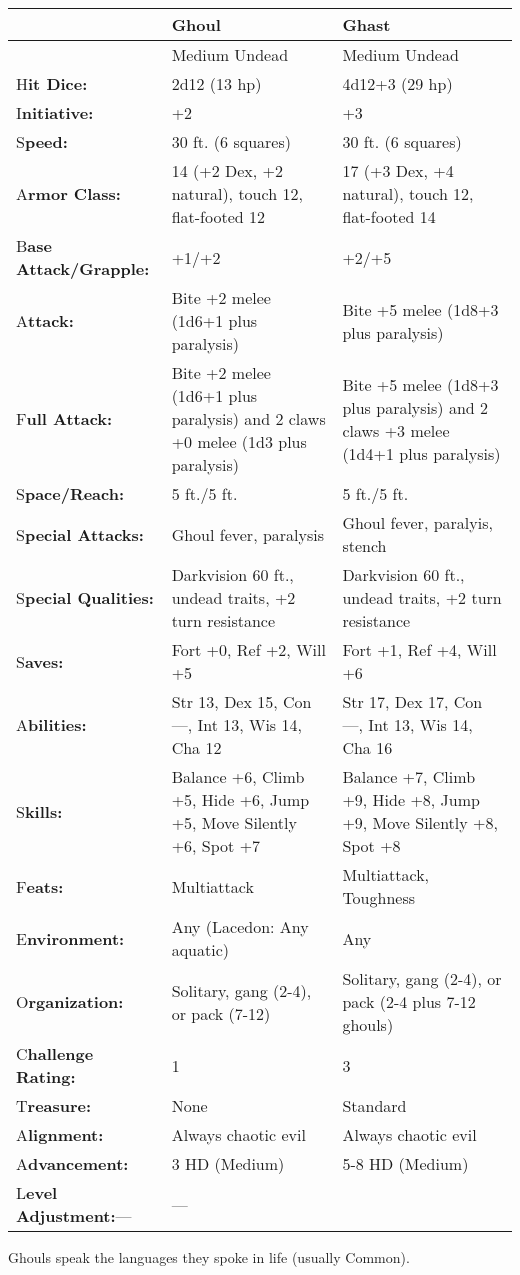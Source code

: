 \documentclass{article}
\begin{document}
\begin{tabular}{|>{\raggedright}p{55pt}|>{\raggedright}p{127pt}|>{\raggedright}p{131pt}|}
\hline
  & G\textbf{houl} & G\textbf{hast}\tabularnewline
\hline
  & Medium Undead & Medium Undead\tabularnewline
\hline
H\textbf{it Dice:} & 2d12 (13 hp) & 4d12+3 (29 hp)\tabularnewline
\hline
I\textbf{nitiative:} & +2 & +3\tabularnewline
\hline
S\textbf{peed:} & 30 ft. (6 squares) & 30 ft. (6 squares)\tabularnewline
\hline
A\textbf{rmor Class:} & 14 (+2 Dex, +2 natural), touch 12, flat-footed 12 & 17 
(+3 Dex, +4 natural), touch 12, flat-footed 14\tabularnewline
\hline
B\textbf{ase Attack/Grapple:} & +1/+2 & +2/+5\tabularnewline
\hline
A\textbf{ttack:} & Bite +2 melee (1d6+1 plus paralysis) & Bite +5 melee (1d8+3 
plus paralysis)\tabularnewline
\hline
F\textbf{ull Attack:} & Bite +2 melee (1d6+1 plus paralysis) and 2 claws +0 melee 
(1d3 plus paralysis) & Bite +5 melee (1d8+3 plus paralysis) and 2 claws +3 melee 
(1d4+1 plus paralysis)\tabularnewline
\hline
S\textbf{pace/Reach:} & 5 ft./5 ft. & 5 ft./5 ft.\tabularnewline
\hline
S\textbf{pecial Attacks:} & Ghoul fever, paralysis & Ghoul fever, paralyis, stench\tabularnewline
\hline
S\textbf{pecial Qualities:} & Darkvision 60 ft., undead traits, +2 turn resistance & Darkvision 
60 ft., undead traits, +2 turn resistance\tabularnewline
\hline
S\textbf{aves:} & Fort +0, Ref +2, Will +5 & Fort +1, Ref +4, Will +6\tabularnewline
\hline
A\textbf{bilities:} & Str 13, Dex 15, Con ---, Int 13, Wis 14, Cha 12 & Str 17, 
Dex 17, Con ---, Int 13, Wis 14, Cha 16\tabularnewline
\hline
S\textbf{kills:} & Balance +6, Climb +5, Hide +6, Jump +5, Move Silently +6, Spot 
+7 & Balance +7, Climb +9, Hide +8, Jump +9, Move Silently +8, Spot +8\tabularnewline
\hline
F\textbf{eats:} & Multiattack & Multiattack, Toughness\tabularnewline
\hline
E\textbf{nvironment:} & Any\linebreak{}
(Lacedon: Any aquatic) & Any\tabularnewline
\hline
O\textbf{rganization:} & Solitary, gang (2-4), or pack (7-12) & Solitary, gang 
(2-4), or pack (2-4 plus 7-12 ghouls)\tabularnewline
\hline
C{\small{}\textbf{hallenge Rating:}} & 1 & 3\tabularnewline
\hline
T\textbf{reasure:} & None & Standard\tabularnewline
\hline
A\textbf{lignment:} & Always chaotic evil & Always chaotic evil\tabularnewline
\hline
A\textbf{dvancement:} & 3 HD (Medium) & 5-8 HD (Medium)\tabularnewline
\hline
L\textbf{evel Adjustment:}--- & --- & \tabularnewline
\hline
\end{tabular}

Ghouls speak the languages they spoke in life (usually Common).
\end{document}
